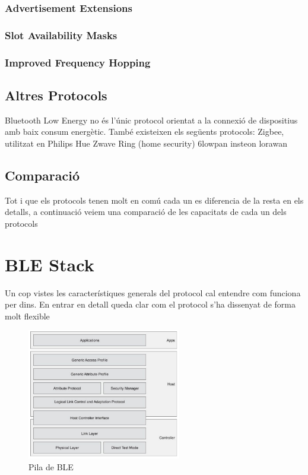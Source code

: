 \subsubsection{Advertisement Extensions}
\subsubsection{Slot Availability Masks}
\subsubsection{Improved Frequency Hopping}


\subsection{Altres Protocols}
Bluetooth Low Energy no és l'únic protocol orientat a la connexió de dispositius amb baix consum energètic. També existeixen els següents protocols:
Zigbee, utilitzat en Philips Hue
Zwave Ring (home security)
6lowpan
insteon
lorawan


\subsection{Comparació}
Tot i que els protocols tenen molt en comú cada un es diferencia de la resta en els detalls, a continuació veiem una comparació de les capacitats de cada un dels protocols

\section{BLE Stack}
Un cop vistes les característiques generals del protocol cal entendre com funciona per dins.
En entrar en detall queda clar com el protocol s'ha dissenyat de forma molt flexible 

\begin{figure}[h!]
	\begin{center}
		\includegraphics[width=0.6\textwidth]{./images/BLE_Stack.png}
		\caption{Pila de BLE \cite{ble_stack}}
		\label{ble_stack}
	\end{center}
\end{figure}

